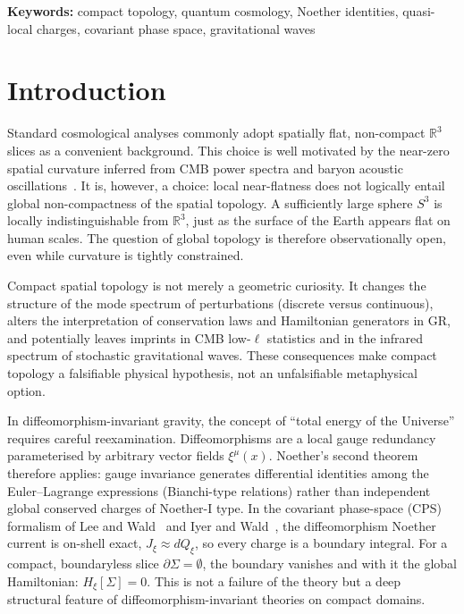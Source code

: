 \documentclass[12pt,a4paper]{article}
\newcommand{\Sig}{\Sigma}           %
\newcommand{\pa}{\partial}          %
\newcommand{\Jxi}{J_\xi}
\newcommand{\Qxi}{Q_\xi}
\newcommand{\Hxi}{H_\xi}
\newcommand{\onshell}{\approx}
\begin{document}
\noindent\textbf{Keywords:} compact topology, quantum cosmology, Noether identities, quasi-local charges, covariant phase space, gravitational waves

\section{Introduction}
\label{sec:intro}

Standard cosmological analyses commonly adopt spatially
flat, non-compact $\mathbb{R}^3$ slices as a convenient
background. This choice is well motivated by the near-zero
spatial curvature inferred from CMB power spectra and
baryon acoustic oscillations~\cite{Planck2018params}. It
is, however, a choice: local near-flatness does not
logically entail global non-compactness of the spatial
topology. A sufficiently large sphere $S^3$ is locally
indistinguishable from $\mathbb{R}^3$, just as the surface
of the Earth appears flat on human scales. The question of
global topology is therefore observationally open, even
while curvature is tightly constrained.

Compact spatial topology is not merely a geometric
curiosity. It changes the structure of the mode spectrum
of perturbations (discrete versus continuous), alters the
interpretation of conservation laws and Hamiltonian
generators in GR, and potentially leaves imprints in CMB
low-$\ell$ statistics and in the infrared spectrum of
stochastic gravitational waves. These consequences make
compact topology a falsifiable physical hypothesis, not an
unfalsifiable metaphysical option.

In diffeomorphism-invariant gravity, the concept of ``total
energy of the Universe'' requires careful reexamination.
Diffeomorphisms are a local gauge redundancy parameterised
by arbitrary vector fields $\xi^\mu(x)$. Noether's second
theorem~\cite{Noether1918} therefore applies: gauge
invariance generates differential identities among the
Euler--Lagrange expressions (Bianchi-type relations) rather
than independent global conserved charges of Noether-I type.
In the covariant phase-space (CPS) formalism of Lee and
Wald~\cite{LeeWald1990} and Iyer and Wald~\cite{IyerWald1994},
the diffeomorphism Noether current is on-shell exact,
$\Jxi \onshell d\Qxi$, so every charge is a boundary
integral. For a compact, boundaryless slice $\pa\Sig =
\emptyset$, the boundary vanishes and with it the global
Hamiltonian: $\Hxi[\Sig] = 0$. This is not a failure of
the theory but a deep structural feature of
diffeomorphism-invariant theories on compact domains.
\end{document}
